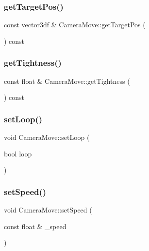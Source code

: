 \mbox{\label{class_camera_move_aee3587ddae21b6b488aff441fe6b35ee}} 
\subsubsection{\texorpdfstring{getTargetPos()}{getTargetPos()}}
{\footnotesize\ttfamily const vector3df \& Camera\+Move\+::get\+Target\+Pos (\begin{DoxyParamCaption}{ }\end{DoxyParamCaption}) const}

\mbox{\label{class_camera_move_abefb0317a48e3461955fe6cf32645fa6}} 
\subsubsection{\texorpdfstring{getTightness()}{getTightness()}}
{\footnotesize\ttfamily const float \& Camera\+Move\+::get\+Tightness (\begin{DoxyParamCaption}{ }\end{DoxyParamCaption}) const}

\mbox{\label{class_camera_move_a69610708690e020a0774ef5ade52e288}} 
\subsubsection{\texorpdfstring{setLoop()}{setLoop()}}
{\footnotesize\ttfamily void Camera\+Move\+::set\+Loop (\begin{DoxyParamCaption}\item[{bool}]{loop }\end{DoxyParamCaption})}

\mbox{\label{class_camera_move_aa201a349bebb67370850864af47528cc}} 
\subsubsection{\texorpdfstring{setSpeed()}{setSpeed()}}
{\footnotesize\ttfamily void Camera\+Move\+::set\+Speed (\begin{DoxyParamCaption}\item[{const float \&}]{\+\_\+speed }\end{DoxyParamCaption})}

